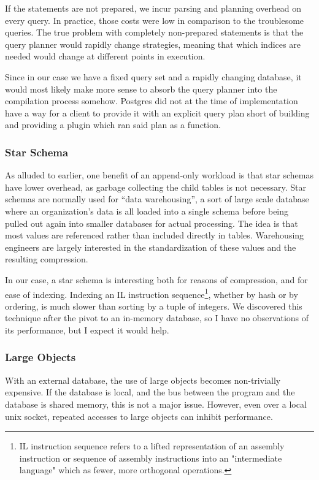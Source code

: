 If the statements are not prepared, we incur parsing and planning overhead on every query.
In practice, those costs were low in comparison to the troublesome queries.
The true problem with completely non-prepared statements is that the query planner would rapidly change strategies, meaning that which indices are needed would change at different points in execution.

Since in our case we have a fixed query set and a rapidly changing database, it would most likely make more sense to absorb the query planner into the compilation process somehow.
Postgres did not at the time of implementation have a way for a client to provide it with an explicit query plan short of building and providing a plugin which ran said plan as a function.

\subsubsection{Star Schema}
As alluded to earlier, one benefit of an append-only workload is that star schemas have lower overhead, as garbage collecting the child tables is not necessary.
Star schemas are normally used for ``data warehousing'', a sort of large scale database where an organization's data is all loaded into a single schema before being pulled out again into smaller databases for actual processing.
The idea is that most values are referenced rather than included directly in tables.
Warehousing engineers are largely interested in the standardization of these values and the resulting compression.

In our case, a star schema is interesting both for reasons of compression, and for ease of indexing.
Indexing an IL instruction sequence\footnote{
IL instruction sequence refers to a lifted representation of an assembly instruction or sequence of assembly instructions into an "intermediate language" which as fewer, more orthogonal operations.
}, whether by hash or by ordering, is much slower than sorting by a tuple of integers.
We discovered this technique after the pivot to an in-memory database, so I have no observations of its performance, but I expect it would help.

\subsubsection{Large Objects}
With an external database, the use of large objects becomes non-trivially expensive.
If the database is local, and the bus between the program and the database is shared memory, this is not a major issue.
However, even over a local unix socket, repeated accesses to large objects can inhibit performance.

